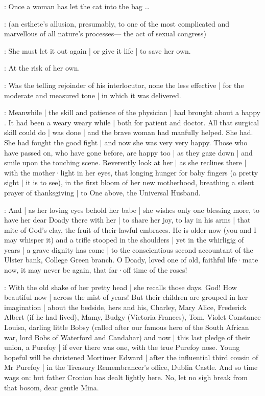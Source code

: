\stephen:
Once a woman has let the cat into the bag \dots

:
(an esthete's allusion,
presumably,
to one of the most complicated and marvellous of all nature's processes---%
the act of sexual congress)

\stephen:
She must let it out again |
or give it life |
to save her own.

\Bloom:
At the risk of her own.

:
Was the telling rejoinder of his interlocutor,
none the less effective |
for the moderate and measured tone |
in which it was delivered.


:
Meanwhile |
the skill and patience of the physician |
had brought about a happy .
It had been a weary weary while |
both for patient and doctor.
All that surgical skill could do |
was done |
and the brave woman had manfully helped.
She had.
She had fought the good fight |
and now she was very very happy.
Those who have passed on,
who have gone before,
are happy too |
as they gaze down |
and smile upon the touching scene.
Reverently look at her |
as she reclines there |
with the mother·light in her eyes,
that longing hunger for baby fingers
(a pretty sight |
it is to see),
in the first bloom of her new motherhood,
breathing a silent prayer of thanksgiving |
to One above,
the Universal Husband.

:
And |
as her loving eyes behold her babe |
she wishes only one blessing more,
to have her dear Doady there with her |
to share her joy,
to lay in his arms |
that mite of God's clay,
the fruit of their lawful embraces.
He is older now
(you and I may whisper it)
and a trifle stooped in the shoulders |
yet in the whirligig of years |
a grave dignity has come |
to the conscientious second accountant of the Ulster bank,
College Green branch.
O Doady,
loved one of old,
faithful life·mate now,
it may never be again,
that far·off time of the roses!

:
With the old shake of her pretty head |
she recalls those days.
God!
How beautiful now |
across the mist of years!
But their children are grouped in her imagination |
about the bedside,
hers and his,
Charley,
Mary
Alice,
Frederick Albert (if he had lived),
Mamy,
Budgy (Victoria Frances),
Tom,
Violet Constance Louisa,
darling little Bobsy
(called after our famous hero of the South African war,
lord Bobs of Waterford and Candahar)
and now |
this last pledge of their union,
a Purefoy |
if ever there was one,
with the true Purefoy nose.
Young hopeful will be christened Mortimer Edward |
after the influential third cousin of Mr Purefoy |
in the Treasury Remembrancer's office,
Dublin Castle.
And so time wags on:
but father Cronion has dealt lightly here.
No,
let no sigh break from that bosom,
dear gentle Mina.

